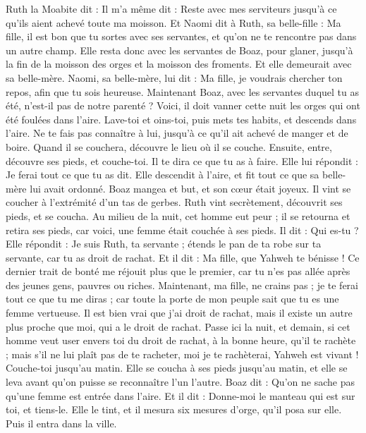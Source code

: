 \begin{multicols}{2}
Ruth la Moabite dit : Il m'a même dit : Reste avec mes serviteurs jusqu'à ce qu'ils aient achevé toute ma moisson.
Et Naomi dit à Ruth, sa belle-fille : Ma fille, il est bon que tu sortes avec ses servantes, et qu'on ne te rencontre pas dans un autre champ.
Elle resta donc avec les servantes de Boaz, pour glaner, jusqu'à la fin de la moisson des orges et la moisson des froments. Et elle demeurait avec sa belle-mère.
\VerseOne{}Naomi, sa belle-mère, lui dit : Ma fille, je voudrais chercher ton repos, afin que tu sois heureuse.
Maintenant Boaz, avec les servantes duquel tu as été, n'est-il pas de notre parenté ? Voici, il doit vanner cette nuit les orges qui ont été foulées dans l'aire.
Lave-toi et oins-toi, puis mets tes habits, et descends dans l'aire. Ne te fais pas connaître à lui, jusqu'à ce qu'il ait achevé de manger et de boire.
Quand il se couchera, découvre le lieu où il se couche. Ensuite, entre, découvre ses pieds, et couche-toi. Il te dira ce que tu as à faire.
Elle lui répondit : Je ferai tout ce que tu as dit.
Elle descendit à l'aire, et fit tout ce que sa belle-mère lui avait ordonné.
Boaz mangea et but, et son cœur était joyeux. Il vint se coucher à l'extrémité d'un tas de gerbes. Ruth vint secrètement, découvrit ses pieds, et se coucha.
Au milieu de la nuit, cet homme eut peur ; il se retourna et retira ses pieds, car voici, une femme était couchée à ses pieds.
Il dit : Qui es-tu ? Elle répondit : Je suis Ruth, ta servante ; étends le pan de ta robe sur ta servante, car tu as droit de rachat.
Et il dit : Ma fille, que Yahweh te bénisse ! Ce dernier trait de bonté me réjouit plus que le premier, car tu n'es pas allée après des jeunes gens, pauvres ou riches.
Maintenant, ma fille, ne crains pas ; je te ferai tout ce que tu me diras ; car toute la porte de mon peuple sait que tu es une femme vertueuse.
Il est bien vrai que j'ai droit de rachat, mais il existe un autre plus proche que moi, qui a le droit de rachat.
Passe ici la nuit, et demain, si cet homme veut user envers toi du droit de rachat, à la bonne heure, qu'il te rachète ; mais s'il ne lui plaît pas de te racheter, moi je te rachèterai, Yahweh est vivant ! Couche-toi jusqu'au matin.
Elle se coucha à ses pieds jusqu'au matin, et elle se leva avant qu'on puisse se reconnaître l'un l'autre. Boaz dit : Qu'on ne sache pas qu'une femme est entrée dans l'aire.
Et il dit : Donne-moi le manteau qui est sur toi, et tiens-le. Elle le tint, et il mesura six mesures d'orge, qu'il posa sur elle. Puis il entra dans la ville.

\end{multicols}

